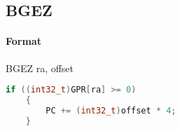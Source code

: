 \subsection{BGEZ}


\paragraph{Format} BGEZ ra, offset

\begin{lstlisting}[language=c]
    if ((int32_t)GPR[ra] >= 0)
    {
        PC += (int32_t)offset * 4;
    }
\end{lstlisting}
